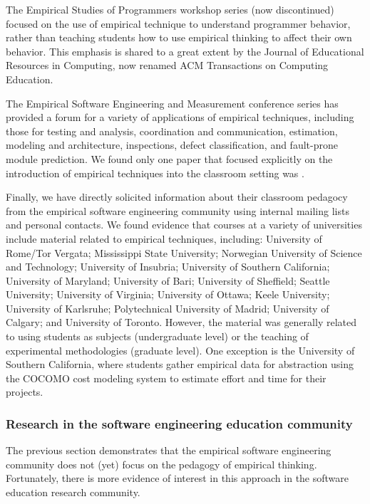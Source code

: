 The Empirical Studies of Programmers workshop series (now discontinued)
focused on the use of empirical technique to understand programmer
behavior, rather than teaching students how to use empirical thinking to
affect their own behavior.  This emphasis is shared to a great extent by
the Journal of Educational Resources in Computing, now renamed ACM
Transactions on Computing Education.

The Empirical Software Engineering and Measurement conference series has
provided a forum for a variety of applications of empirical techniques,
including those for testing and analysis, coordination and communication,
estimation, modeling and architecture, inspections, defect classification,
and fault-prone module prediction.  We found only one paper that focused
explicitly on the introduction of empirical techniques into the classroom
setting was \citep{csdl2-03-12}.

Finally, we have directly solicited information about their classroom
pedagocy from the empirical software engineering community using internal
mailing lists and personal contacts. We found evidence that courses at a
variety of universities include material related to empirical techniques,
including: University of Rome/Tor Vergata; Mississippi State University;
Norwegian University of Science and Technology; University of Insubria;
University of Southern California; University of Maryland; University of
Bari; University of Sheffield; Seattle University; University of Virginia;
University of Ottawa; Keele University; University of Karlsruhe;
Polytechnical University of Madrid; University of Calgary; and University
of Toronto.  However, the material was generally related to using students
as subjects (undergraduate level) or the teaching of experimental
methodologies (graduate level).  One exception is the University of
Southern California, where students gather empirical data for abstraction
using the COCOMO cost modeling system to estimate effort and time for their
projects.

\subsubsection{Research in the software engineering education community}

The previous section demonstrates that the empirical software engineering
community does not (yet) focus on the pedagogy of empirical thinking. Fortunately, 
there is more evidence of interest in this approach in the software education 
research community.

